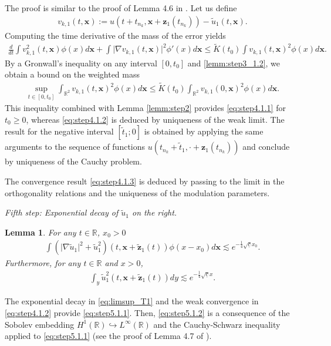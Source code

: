 \documentclass[reqno,10pt]{amsart}
\newtheorem{lemm}{Lemma}[section]
\numberwithin{equation}{section}
\newcommand{\bx}{\mathbf{x}}
\newcommand{\bz}{\mathbf{z}}
\begin{document}
		The proof is similar to the proof of Lemma 4.6 in \cite{CMPS16}. Let us define
  \begin{align}\label{defi:v_k1}
      v_{k,1}(t,\bx) := u\left(t+t_{n_k},\bx+ \bz_1(t_{n_k}) \right) - \tilde{u}_1(t,\bx).
  \end{align}
  Computing the time derivative of the mass of the error yields
  \begin{align}\label{eq:kato_v_k1}
      \frac{d}{dt} \int v_{k,1}^2(t,\bx) \phi(x) d\bx + \int \vert \nabla v_{k,1}(t,\bx) \vert ^2 \phi' (x) d\bx \leq \tilde{K}(t_0) \int v_{k,1}(t,\bx)^2 \phi (x) d\bx. 
  \end{align}
  By a Gronwall's inequality on any interval $[0,t_0]$ and \eqref{lemm:step3_1.2}, we obtain a bound on the weighted mass
		\begin{align*}
			\sup_{t \in [0,t_0]}\int_{\mathbb{R}^2} v_{k,1}(t,\bx)^2 \phi (x) d\bx \leq \tilde{K}(t_0) \int_{\mathbb{R}^2} v_{k,1}(0,\bx)^2 \phi (x) d\bx.
		\end{align*} 
		This inequality combined with Lemma \ref{lemm:step2} provides \eqref{eq:step4.1.1} for $t_0\geq0$, whereas \eqref{eq:step4.1.2} is deduced by uniqueness of the weak limit. The result for the negative interval $[\tilde{t}_1;0]$ is obtained by applying the same arguments to the sequence of functions $ u\left(t_{n_k}+\tilde{t}_1, \cdot + \bz_1(t_{n_k}) \right)$ and conclude by uniqueness of the Cauchy problem.
		
		The convergence result \eqref{eq:step4.1.3} is deduced by passing to the limit in the orthogonality relations and the uniqueness of the modulation parameters.
		
		\vspace{0.5cm}
  \noindent \textit{Fifth step: Exponential decay of $\tilde{u}_{1}$ on the right.}
		
		\begin{lemm}\label{lemm:step5_1}
			For any $t \in \mathbb{R}$, $x_0>0$
			\begin{align}\label{eq:step5.1.1}
				\int \left( \vert \nabla \tilde{u}_1 \vert^2 + \tilde{u}_1^2 \right) \left(t, \bx +\tilde{\bz}_1(t) \right) \phi (x-x_0) d\bx \lesssim e^{-\frac14 \sqrt{\underline{c}} x_0}.
			\end{align}
			Furthermore, for any $t\in \mathbb{R}$ and $x>0$,
			\begin{align}\label{eq:step5.1.2}
				\int_y \tilde{u}_1^2 \left(t, \bx+ \tilde{\bz}_1(t) \right) dy \lesssim e^{-\frac14 \sqrt{\underline{c}} x}.
			\end{align}
		\end{lemm}
		The exponential decay in \eqref{eq:limsup_T1} and the weak convergence in \eqref{eq:step4.1.2} provide \eqref{eq:step5.1.1}. Then, \eqref{eq:step5.1.2} is a consequence of the Sobolev embedding $H^1(\mathbb{R}) \hookrightarrow L^\infty(\mathbb{R})$ and the Cauchy-Schwarz inequality applied to \eqref{eq:step5.1.1} (see the proof of Lemma 4.7 of \cite{CMPS16}).
		
\end{document}
